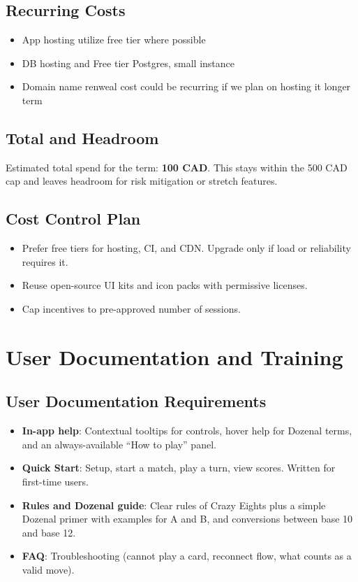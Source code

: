 \documentclass[12pt]{article}
\begin{document}
\subsection{Recurring Costs}
\begin{itemize}
  \item App hosting utilize free tier where possible
  \item DB hosting and Free tier Postgres, small instance
  \item Domain name renweal cost could be recurring if we plan on hosting it longer term
\end{itemize}

\subsection{Total and Headroom}
\noindent Estimated total spend for the term: \textbf{100 CAD}. This stays within the 500 CAD cap and leaves headroom for risk mitigation or stretch features.

\subsection{Cost Control Plan}
\begin{itemize}
  \item Prefer free tiers for hosting, CI, and CDN. Upgrade only if load or reliability requires it.
  \item Reuse open-source UI kits and icon packs with permissive licenses.
  \item Cap incentives to pre-approved number of sessions.
\end{itemize}

\section{User Documentation and Training}

\subsection{User Documentation Requirements}
\begin{itemize}
  \item \textbf{In-app help}: Contextual tooltips for controls, hover help for Dozenal terms, and an always-available ``How to play'' panel.
  \item \textbf{Quick Start}: Setup, start a match, play a turn, view scores. Written for first-time users.
  \item \textbf{Rules and Dozenal guide}: Clear rules of Crazy Eights plus a simple Dozenal primer with examples for A and B, and conversions between base 10 and base 12.
  \item \textbf{FAQ}: Troubleshooting (cannot play a card, reconnect flow, what counts as a valid move).
\end{itemize}
\end{document}
